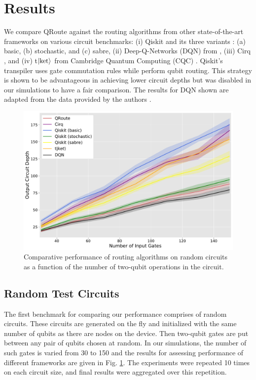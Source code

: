 \section{\label{sec:results}Results}
We compare QRoute against the routing algorithms from other state-of-the-art frameworks on various circuit benchmarks: (i) Qiskit and its three variants \cite{comp_qiskit}: (a) basic, (b) stochastic, and (c) sabre, (ii) Deep-Q-Networks (DQN) from \cite{qroute_dqn2}, (iii) Cirq \cite{comp_cirq}, and (iv) t$\ket{\text{ket}}$ from Cambridge Quantum Computing (CQC) \cite{comp_pytket}. 
Qiskit's transpiler uses gate commutation rules while perform qubit routing. This strategy is shown to be advantageous in achieving lower circuit depths \cite{bridge_gate} but was disabled in our simulations to have a fair comparison. The results for DQN shown are adapted from the data provided by the authors \cite{qroute_dqn2}.

\begin{figure}[t]
    \includegraphics[width=\linewidth]{figures/qroute/random_benchmark.pdf}
    \caption{\label{fig:results-random}
        Comparative performance of routing algorithms on random circuits as a function of the number of two-qubit operations in the circuit.}
\end{figure}

\subsection{\label{sec:results-random}Random Test Circuits}

The first benchmark for comparing our performance comprises of random circuits. These circuits are generated on the fly and initialized with the same number of qubits as there are nodes on the device. Then two-qubit gates are put between any pair of qubits chosen at random. In our simulations, the number of such gates is varied from 30 to 150 and the results for assessing performance of different frameworks are given in Fig. \ref{fig:results-random}. The experiments were repeated 10 times on each circuit size, and final results were aggregated over this repetition. 


